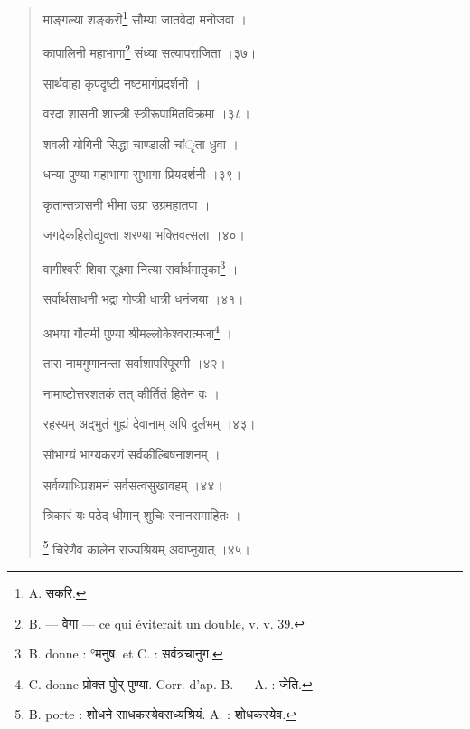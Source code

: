 \documentclass[a4paper, 11pt, oneside, french]{article}
\begin{document}
\begin{quotation}
\bigskip

\texthindi{माङ्गल्या शङ्करी}\footnote{A. \texthindi{सकरि}.} \texthindi{सौम्या जातवेदा मनोजवा ।}

\texthindi{कापालिनी महाभागा}\footnote{B. --- \texthindi{वेगा} --- ce qui éviterait un double, v. v. 39.} \texthindi{संध्या सत्यापराजिता ।३७।}

\bigskip

\texthindi{सार्थवाहा कृपदृष्टी नष्टमार्गप्रदर्शनी ।}

\texthindi{वरदा शासनी शास्त्री स्त्रीरूपामितविक्रमा ।३८।}

\bigskip

\texthindi{शवली योगिनी सिद्धा चाण्डाली चांृता ध्रुवा ।}

\texthindi{धन्या पुण्या महाभागा सुभागा प्रियदर्शनी ।३९।}

\bigskip

\texthindi{कृतान्तत्रासनी भीमा उग्रा उग्रमहातपा ।}

\texthindi{जगदेकहितोद्युक्ता शरण्या भक्तिवत्सला ।४०।}

\bigskip

\texthindi{वागीश्वरी शिवा सूक्ष्मा नित्या सर्वार्थमातृका}\footnote{B. donne : °\texthindi{मनुष.} et C. : \texthindi{सर्वत्रचानुग.}} \texthindi{।}

\texthindi{सर्वार्थसाधनी भद्रा गोप्त्री धात्री धनंजया ।४१।}

\bigskip

\texthindi{अभया गौतमी पुण्या श्रीमल्लोकेश्वरात्मजा}\footnote{C. donne \texthindi{प्रोक्त पोुर् पुण्या}. Corr. d'ap. B. --- A. : \texthindi{जेति}.} \texthindi{।}

\texthindi{तारा नामगुणानन्ता सर्वाशापरिपूरणी ।४२।}

\bigskip

\texthindi{नामाष्टोत्तरशतकं तत् कीर्तितं हितेन वः ।}

\texthindi{रहस्यम् अद्भुतं गुह्यं देवानाम् अपि दुर्लभम् ।४३।}

\bigskip

\texthindi{सौभाग्यं भाग्यकरणं सर्वकील्बिषनाशनम् ।}

\texthindi{सर्वव्याधिप्रशमनं सर्वसत्वसुखावहम् ।४४।}

\bigskip

\texthindi{त्रिकारं यः पठेद् धीमान् शुचिः स्नानसमाहितः ।}

\footnote{B. porte : \texthindi{शोधने साधकस्येवराध्यश्रियं.} A. : \texthindi{शोधकस्येव.}} \texthindi{चिरेणैव कालेन राज्यश्रियम् अवाप्नुयात् ।४५।}

\bigskip


\end{quotation}
\end{document}

